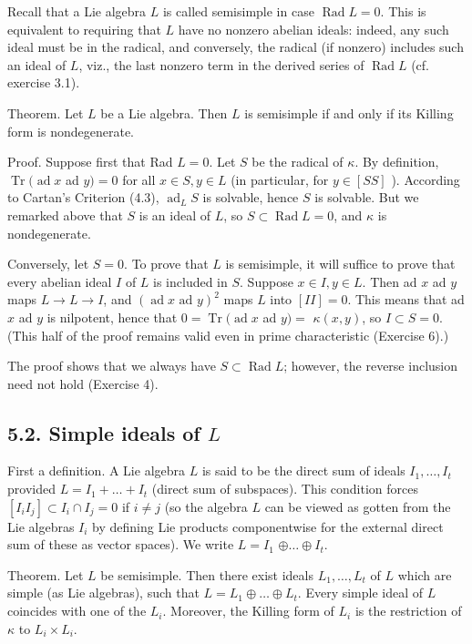 \documentclass[10pt]{article}
\begin{document}
Recall that a Lie algebra $L$ is called semisimple in case $\operatorname{Rad} L=0$. This is equivalent to requiring that $L$ have no nonzero abelian ideals: indeed, any such ideal must be in the radical, and conversely, the radical (if nonzero) includes such an ideal of $L$, viz., the last nonzero term in the derived series of $\operatorname{Rad} L$ (cf. exercise 3.1).

Theorem. Let $L$ be a Lie algebra. Then $L$ is semisimple if and only if its Killing form is nondegenerate.

Proof. Suppose first that Rad $L=0$. Let $S$ be the radical of $\kappa$. By definition, $\operatorname{Tr}(\operatorname{ad} x$ ad $y)=0$ for all $x \in S, y \in L$ (in particular, for $y \in[S S]$ ). According to Cartan's Criterion (4.3), $\operatorname{ad}_{L} S$ is solvable, hence $S$ is solvable. But we remarked above that $S$ is an ideal of $L$, so $S \subset \operatorname{Rad} L=0$, and $\kappa$ is nondegenerate.

Conversely, let $S=0$. To prove that $L$ is semisimple, it will suffice to prove that every abelian ideal $I$ of $L$ is included in $S$. Suppose $x \in I, y \in L$. Then ad $x$ ad $y$ maps $L \rightarrow L \rightarrow I$, and $(\operatorname{ad} x \text { ad } y)^{2}$ maps $L$ into $[I I]=0$. This means that ad $x$ ad $y$ is nilpotent, hence that $0=\operatorname{Tr}(\operatorname{ad} x$ ad $y)=$ $\kappa(x, y)$, so $I \subset S=0$. (This half of the proof remains valid even in prime characteristic (Exercise 6).)

The proof shows that we always have $S \subset \operatorname{Rad} L$; however, the reverse inclusion need not hold (Exercise 4).

\subsection*{5.2. Simple ideals of $L$}
First a definition. A Lie algebra $L$ is said to be the direct sum of ideals $I_{1}, \ldots, I_{t}$ provided $L=I_{1}+\ldots+I_{t}$ (direct sum of subspaces). This condition forces $\left[I_{i} I_{j}\right] \subset I_{i} \cap I_{j}=0$ if $i \neq j$ (so the algebra $L$ can be viewed as gotten from the Lie algebras $I_{i}$ by defining Lie products componentwise for the external direct sum of these as vector spaces). We write $L=I_{1}$ $\oplus \ldots \oplus I_{t}$.

Theorem. Let $L$ be semisimple. Then there exist ideals $L_{1}, \ldots, L_{t}$ of $L$ which are simple (as Lie algebras), such that $L=L_{1} \oplus \ldots \oplus L_{t}$. Every simple ideal of $L$ coincides with one of the $L_{i}$. Moreover, the Killing form of $L_{i}$ is the restriction of $\kappa$ to $L_{i} \times L_{i}$.
\end{document}
